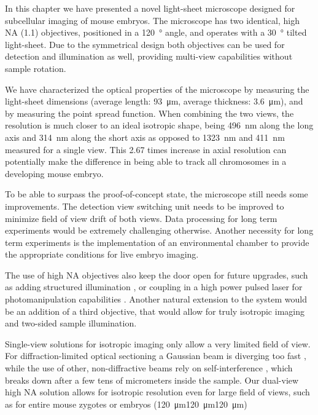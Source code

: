   In this chapter we have presented a novel light-sheet microscope designed for subcellular imaging of mouse embryos. The microscope has two identical, high NA (1.1) objectives, positioned in a \SI{120}{\degree} angle, and operates with a \SI{30}{\degree} tilted light-sheet. Due to the symmetrical design both objectives can be used for detection and illumination as well, providing multi-view capabilities without sample rotation.

  We have characterized the optical properties of the microscope by measuring the light-sheet dimensions (average length: \SI{93}{\micro m}, average thickness: \SI{3.6}{\micro m}), and by measuring the point spread function. When combining the two views, the resolution is much closer to an ideal isotropic shape, being \SI{496}{nm} along the long axis and \SI{314}{nm} along the short axis as opposed to \SI{1323}{nm} and \SI{411}{nm} measured for a single view. This 2.67 times increase in axial resolution can potentially make the difference in being able to track all chromosomes in a developing mouse embryo.

  To be able to surpass the proof-of-concept state, the microscope still needs some improvements. The detection view switching unit needs to be improved to minimize field of view drift of both views. Data processing for long term experiments would be extremely challenging otherwise. Another necessity for long term experiments is the implementation of an environmental chamber to provide the appropriate conditions for live embryo imaging.

  The use of high NA objectives also keep the door open for future upgrades, such as adding structured illumination \cite{keller_fast_2010, chang_csilsfm_2017}, or coupling in a high power pulsed laser for photomanipulation capabilities \cite{rauzi_probing_2017}. Another natural extension to the system would be an addition of a third objective, that would allow for truly isotropic imaging and two-sided sample illumination.


  Single-view solutions for isotropic imaging only allow a very limited field of view. For diffraction-limited optical sectioning a Gaussian beam is diverging too fast \cite{dean_diagonally_2016}, while the use of other, non-diffractive beams rely on self-interference \cite{chen_lattice_2014}, which breaks down after a few tens of micrometers inside the sample. Our dual-view high NA solution allows for isotropic resolution even for large field of views, such as for entire mouse zygotes or embryos (\SI{120}{\micro m}\texttimes\SI{120}{\micro m}\texttimes\SI{120}{\micro m})
  